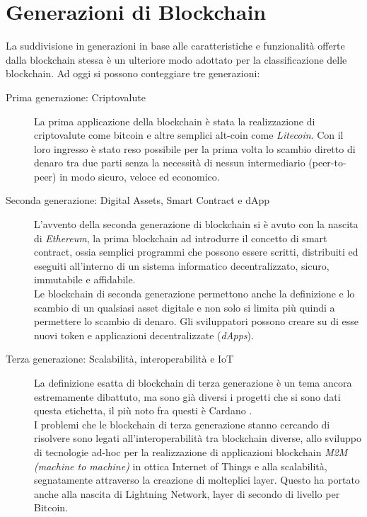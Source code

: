\section{Generazioni di Blockchain}
La suddivisione in generazioni in base alle caratteristiche e funzionalità offerte dalla blockchain stessa è un ulteriore modo adottato per la classificazione delle blockchain. Ad oggi si possono conteggiare tre generazioni:
\begin{description}
  \item[Prima generazione: Criptovalute] La prima applicazione della blockchain è stata la realizzazione di criptovalute come bitcoin e altre semplici alt-coin come \textit{Litecoin}. Con il loro ingresso è stato reso possibile per la prima volta lo scambio diretto di denaro tra due parti senza la necessità di nessun intermediario (peer-to-peer) in modo sicuro, veloce ed economico.
  \item[Seconda generazione: Digital Assets, Smart Contract e dApp] L'avvento della seconda generazione di blockchain si è avuto con la nascita di \textit{Ethereum}, la prima blockchain ad introdurre il concetto di smart contract, ossia semplici programmi che possono essere scritti, distribuiti ed eseguiti all'interno di un sistema informatico decentralizzato, sicuro, immutabile e affidabile.\\Le blockchain di seconda generazione permettono anche la definizione e lo scambio di un qualsiasi asset digitale e non solo si limita più quindi a permettere lo scambio di denaro. Gli sviluppatori possono creare su di esse nuovi token e applicazioni decentralizzate (\textit{dApps}).
  \item[Terza generazione: Scalabilità, interoperabilità e IoT] La definizione esatta di blockchain di terza generazione è un tema ancora estremamente dibattuto, ma sono già diversi i progetti che si sono dati questa etichetta, il più noto fra questi è Cardano \cite{conor_2021}.\\I problemi che le blockchain di terza generazione stanno cercando di risolvere sono legati all'interoperabilità tra blockchain diverse, allo sviluppo di tecnologie ad-hoc per la realizzazione di applicazioni blockchain \textit{M2M (machine to machine)} in ottica Internet of Things e alla scalabilità, segnatamente attraverso la creazione di molteplici layer. Questo ha portato anche alla nascita di Lightning Network, layer di secondo di livello per Bitcoin.
\end{description}